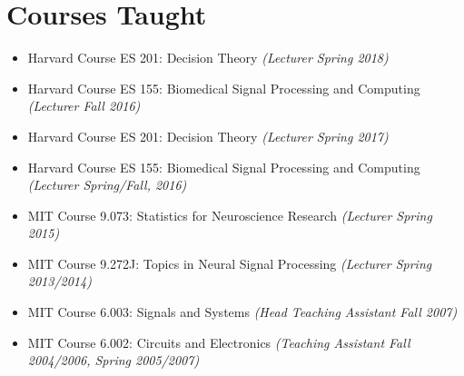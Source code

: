 \section*{Courses Taught}

  \begin{itemize}
    	  \item Harvard Course ES 201: Decision Theory \emph{(Lecturer Spring 2018)}
   	  \item Harvard Course ES 155: Biomedical Signal Processing and Computing \emph{(Lecturer Fall 2016)}
  	  \item Harvard Course ES 201: Decision Theory \emph{(Lecturer Spring 2017)}
   	  \item Harvard Course ES 155: Biomedical Signal Processing and Computing \emph{(Lecturer Spring/Fall, 2016)}
      \item MIT Course 9.073: Statistics for Neuroscience Research \emph{(Lecturer Spring 2015)}
      \item MIT Course 9.272J: Topics in Neural Signal Processing \emph{(Lecturer Spring 2013/2014)}
      \item MIT Course 6.003: Signals and Systems \emph{(Head Teaching Assistant Fall 2007)}
      \item MIT Course 6.002: Circuits and Electronics \emph{(Teaching Assistant Fall 2004/2006, Spring 2005/2007)}
  \end{itemize}
